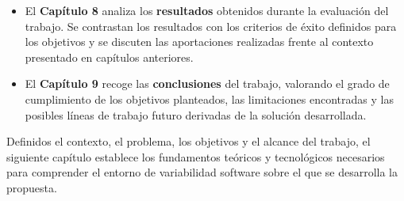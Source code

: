 \begin{itemize}
    \item El \textbf{Capítulo 8} analiza los \textbf{resultados} obtenidos durante la evaluación del trabajo. Se contrastan los resultados con los criterios de éxito definidos para los objetivos y se discuten las aportaciones realizadas frente al contexto presentado en capítulos anteriores.

    \item El \textbf{Capítulo 9} recoge las \textbf{conclusiones} del trabajo, valorando el grado de cumplimiento de los objetivos planteados, las limitaciones encontradas y las posibles líneas de trabajo futuro derivadas de la solución desarrollada.
\end{itemize}

Definidos el contexto, el problema, los objetivos y el alcance del trabajo, el siguiente capítulo establece los fundamentos teóricos y tecnológicos necesarios para comprender el entorno de variabilidad software sobre el que se desarrolla la propuesta.

